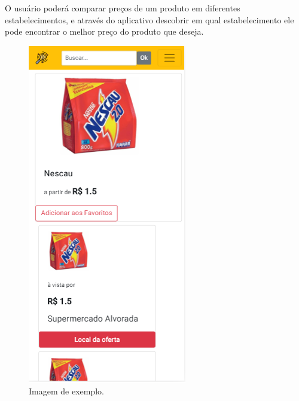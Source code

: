 O usuário poderá comparar preços de um produto em diferentes estabelecimentos, e através do aplicativo descobrir em qual estabelecimento ele pode encontrar o melhor preço do produto que deseja.

\begin{figure}[!htb]
\centering
\caption{Imagem de exemplo.}
\includegraphics[width=\linewidth]{figuras/tela-comparar.png}
\end{figure}

